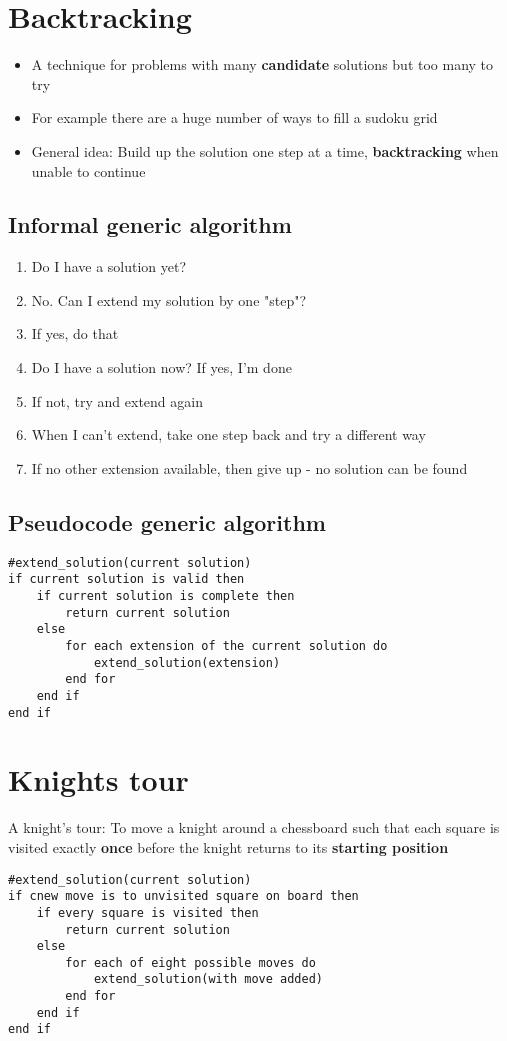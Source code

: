 \documentclass{article}[18pt]
\begin{document}
\section{Backtracking}
\begin{itemize}
\item A technique for problems with many \textbf{candidate} solutions but too many to try
\item For example there are a huge number of ways to fill a sudoku grid
\item General idea: Build up the solution one step at a time, \textbf{backtracking} when unable to continue
\end{itemize}
\subsection{Informal generic algorithm}
\begin{enumerate}
\item Do I have a solution yet?
\item No. Can I extend my solution by one "step"?
\item If yes, do that
\item Do I have a solution now? If yes, I'm done
\item If not, try and extend again
\item When I can't extend, take one step back and try a different way
\item If no other extension available, then give up - no solution can be found
\end{enumerate}
\subsection{Pseudocode generic algorithm}
\begin{lstlisting}[mathescape=true]
#extend_solution(current solution)
if current solution is valid then
	if current solution is complete then
		return current solution
	else
		for each extension of the current solution do
			extend_solution(extension)
		end for
	end if
end if
\end{lstlisting}
\section{Knights tour}
A knight's tour: To move a knight around a chessboard such that each square is visited exactly \textbf{once} before the knight returns to its \textbf{starting position}
\begin{lstlisting}[mathescape=true]
#extend_solution(current solution)
if cnew move is to unvisited square on board then
	if every square is visited then
		return current solution
	else
		for each of eight possible moves do
			extend_solution(with move added)
		end for
	end if
end if
\end{lstlisting}
\end{document}
